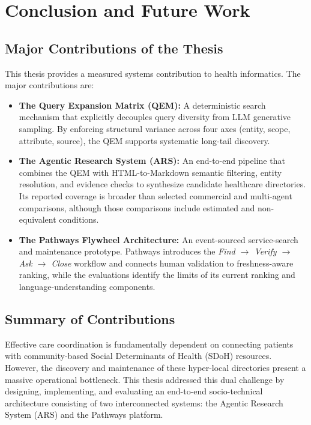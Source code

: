 \documentclass[12pt,oneside]{report}
\begin{document}
\chapter{Conclusion and Future Work}

\section{Major Contributions of the Thesis}
This thesis provides a measured systems contribution to health informatics. The major contributions are:
\begin{itemize}
    \item \textbf{The Query Expansion Matrix (QEM):} A deterministic search mechanism that explicitly decouples query diversity from LLM generative sampling. By enforcing structural variance across four axes (entity, scope, attribute, source), the QEM supports systematic long-tail discovery.
    \item \textbf{The Agentic Research System (ARS):} An end-to-end pipeline that combines the QEM with HTML-to-Markdown semantic filtering, entity resolution, and evidence checks to synthesize candidate healthcare directories. Its reported coverage is broader than selected commercial and multi-agent comparisons, although those comparisons include estimated and non-equivalent conditions.
    \item \textbf{The Pathways Flywheel Architecture:} An event-sourced service-search and maintenance prototype. Pathways introduces the \textit{Find $\rightarrow$ Verify $\rightarrow$ Ask $\rightarrow$ Close} workflow and connects human validation to freshness-aware ranking, while the evaluations identify the limits of its current ranking and language-understanding components.
\end{itemize}

\section{Summary of Contributions}
Effective care coordination is fundamentally dependent on connecting patients with community-based Social Determinants of Health (SDoH) resources. However, the discovery and maintenance of these hyper-local directories present a massive operational bottleneck. This thesis addressed this dual challenge by designing, implementing, and evaluating an end-to-end socio-technical architecture consisting of two interconnected systems: the Agentic Research System (ARS) and the Pathways platform.
\end{document}
